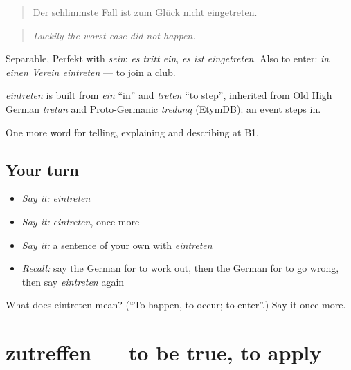 \begin{quote}
Der schlimmste Fall ist zum Glück nicht eingetreten.
\end{quote}

\begin{quote}
\emph{Luckily the worst case did not happen.}
\end{quote}

Separable, Perfekt with \emph{sein}: \emph{es tritt ein}, \emph{es ist eingetreten}. Also to enter: \emph{in einen Verein eintreten} — to join a club.

\begin{cousinweb}
\emph{eintreten} is built from \emph{ein} \textquotedblleft{}in\textquotedblright{} and \emph{treten} \textquotedblleft{}to step\textquotedblright{}, inherited from Old High German \emph{tretan} and Proto-Germanic \emph{tredaną} (EtymDB): an event steps in.
\end{cousinweb}

\begin{grammarlens}[title={What you've built}]
One more word for telling, explaining and describing at B1.
\end{grammarlens}

\subsection*{Your turn}
\begin{itemize}
\raggedright
  \item \emph{Say it:} \emph{eintreten}
  \item \emph{Say it:} \emph{eintreten}, once more
  \item \emph{Say it:} a sentence of your own with \emph{eintreten}
  \item \emph{Recall:} say the German for to work out, then the German for to go wrong, then say \emph{eintreten} again
\end{itemize}

\begin{tcolorbox}[breakable,colback=teal!4,colframe=teal!35!black,title={Before you move on}]
What does eintreten mean? (\textquotedblleft{}To happen, to occur; to enter\textquotedblright{}.) Say it once more.
\end{tcolorbox}
\section[zutreffen]{zutreffen — to be true, to apply}

\label{lesson:GE-C370-zutreffen}



